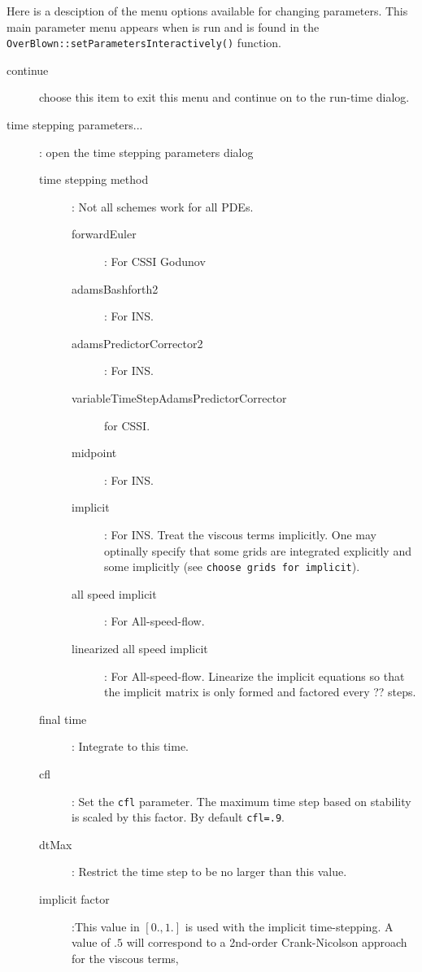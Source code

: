 
 
\newlength{\setParametersIncludeArgIndent}

 Here is a desciption of the menu options available for changing parameters. This main parameter menu appears
 when \OverBlown is run and is found in the {\tt OverBlown::\-set\-Parameters\-Interactively()} function.
\begin{description}
  \item[continue] choose this item to exit this menu and continue on to the run-time dialog.
  \item[time stepping parameters...] : open the time stepping parameters dialog
    \begin{description}
      \item[time stepping method] : Not all schemes work for all PDEs. 
        \begin{description}
          \item[forwardEuler] : For CSSI Godunov
          \item[adamsBashforth2] : For INS.
          \item[adamsPredictorCorrector2] : For INS.
          \item[variableTimeStepAdamsPredictorCorrector] for CSSI.
          \item[midpoint] : For INS.
          \item[implicit] : For INS. Treat the viscous terms implicitly. One may optinally specify that some
             grids are integrated explicitly and some implicitly (see {\tt choose grids for implicit}).
          \item[all speed implicit] : For All-speed-flow.
          \item[linearized all speed implicit] :  For All-speed-flow. Linearize the implicit equations so that
             the implicit matrix is only formed and factored every ?? steps.
        \end{description}
      \item[final time] : Integrate to this time.
      \item[cfl] : Set the {\tt cfl} parameter. 
         The maximum time step based on stability is scaled by this factor.
         By default {\tt cfl=.9}. 
      \item[dtMax] : Restrict the time step to be no larger than this value.
      \item[implicit factor] :This value in $[0.,1.]$ is used with the implicit time-stepping. A value
         of $.5$ will correspond to a 2nd-order Crank-Nicolson approach for the viscous terms,

\end{description}
\end{description}
